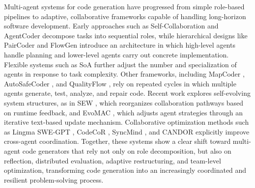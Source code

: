 Multi-agent systems for code generation have progressed from simple role-based pipelines to adaptive, 
collaborative frameworks capable of handling long-horizon software development. Early approaches such 
as Self-Collaboration \citep{dong2024self} and AgentCoder \citep{huang2023agentcoder} decompose tasks 
into sequential roles, while hierarchical designs like PairCoder \citep{zhang2024pair} and FlowGen 
\citep{lin2024soen} introduce an architecture in which high-level agents handle planning and lower-level 
agents carry out concrete implementation. Flexible systems such as SoA \citep{ishibashi2024self} further 
adjust the number and specialization of agents in response to task complexity. Other frameworks, 
including MapCoder \citep{islam2024mapcoder}, AutoSafeCoder 
\citep{nunez2024autosafecoder}, and QualityFlow 
\citep{hu2025qualityflow}, rely on repeated cycles in which multiple agents 
generate, test, analyze, and repair code. Recent work explores self-evolving system structures, as in 
SEW \citep{liu2025sew}, which reorganizes collaboration pathways based on runtime feedback, and EvoMAC 
\citep{hu2024self}, which adjusts agent strategies through an iterative text-based update mechanism. 
Collaborative optimization methods such as Lingma SWE-GPT \citep{ma2024lingmaswegptopendevelopmentprocesscentric}, 
CodeCoR \citep{pan2025codecor}, SyncMind \citep{guo2025syncmind}, and CANDOR 
\citep{xu2025hallucinationconsensusmultiagentllms} explicitly improve cross-agent coordination. 
Together, these systems show a clear shift toward multi-agent code generators that rely not only on 
role decomposition, but also on reflection, distributed evaluation, adaptive restructuring, and 
team-level optimization, transforming code generation into an increasingly coordinated and resilient 
problem-solving process.

